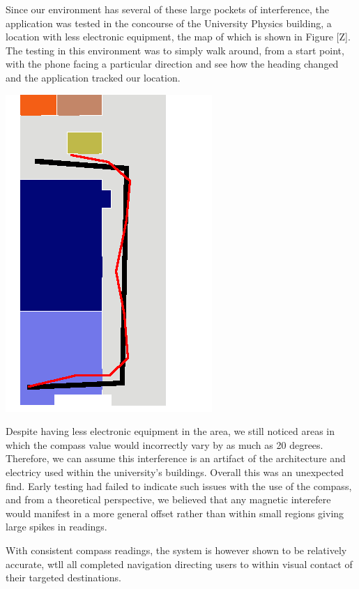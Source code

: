 \documentclass[12pt,a4paper]{report}
\begin{document}
Since our environment has several of these large pockets of interference, the application was tested in the concourse of the University Physics building, a location with less electronic equipment, the map of which is shown in Figure [Z]. The testing in this environment was to simply walk around, from a start point, with the phone facing a particular direction and see how the heading changed and the application tracked our location.

\begin{center}
\includegraphics[scale=1]{images/figureZ.png}
\label{fig:figureZ}
\end{center}

Despite having less electronic equipment in the area, we still noticed areas in which the compass value would incorrectly vary by as much as 20 degrees. Therefore, we can assume this interference is an artifact of the architecture and electricy used within the university's buildings. Overall this was an unexpected find. Early testing had failed to indicate such issues with the use of the compass, and from a theoretical perspective, we believed that any magnetic interefere would manifest in a more general offset rather than within small regions giving large spikes in readings.

With consistent compass readings, the system is however shown to be relatively accurate, wtll all completed navigation directing users to within visual contact of their targeted destinations.
\end{document}
